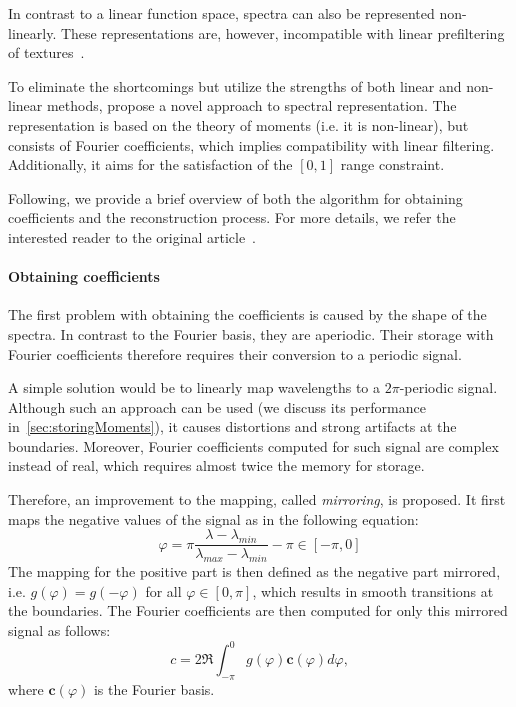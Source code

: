 In contrast to a linear function space, spectra can also be represented non-linearly. These representations are, however, incompatible with linear prefiltering of textures~\cite{trigonometricMomentsPaper}.

To eliminate the shortcomings but utilize the strengths of both linear and non-linear methods, \citet{trigonometricMomentsPaper} propose a novel approach to spectral representation. The representation is based on the theory of moments (i.e. it is non-linear), but consists of Fourier coefficients, which implies compatibility with linear filtering. Additionally, it aims for the satisfaction of the $[0,1]$ range constraint.

Following, we provide a brief overview of both the algorithm for obtaining coefficients and the reconstruction process. For more details, we refer the interested reader to the original article~\cite{trigonometricMomentsPaper}.

\paragraph{Obtaining coefficients} \label{par:spectrumToCoefficientConversion}

The first problem with obtaining the coefficients is caused by the shape of the spectra. In contrast to the Fourier basis, they are aperiodic. Their storage with Fourier coefficients therefore requires their conversion to a periodic signal.

A simple solution would be to linearly map wavelengths to a $2\pi$-periodic signal. Although such an approach can be used (we discuss its performance in~\cref{sec:storingMoments}), it causes distortions and strong artifacts at the boundaries. Moreover, Fourier coefficients computed for such signal are complex instead of real, which requires almost twice the memory for storage.

Therefore, an improvement to the mapping, called \emph{mirroring}, is proposed. It first maps the negative values of the signal as in the following equation:
\begin{equation} \label{wavelengthPhaseMapping}
\varphi =\pi \dfrac{\lambda - \lambda_{min}}{\lambda_{max} - \lambda_{min}} - \pi\in[-\pi, 0]
\end{equation}
The mapping for the positive part is then defined as the negative part mirrored, i.e. $g(\varphi) = g(-\varphi)$ for all $\varphi\in[0,\pi]$, which results in smooth transitions at the boundaries. The Fourier coefficients are then computed for only this mirrored signal as follows:
\begin{equation*}
c = 2\Re \int_{-\pi}^0 g(\varphi)\mathbf{c}(\varphi)d\varphi,
\end{equation*}
where $\mathbf{c}(\varphi)$ is the Fourier basis.

